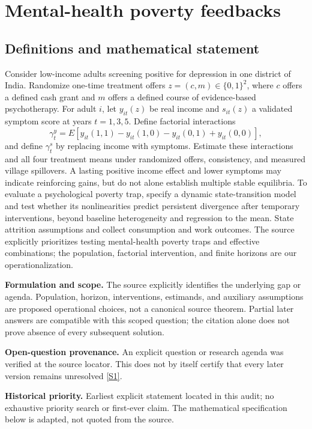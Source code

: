 \documentclass[11pt]{article}
\newcommand{\sref}[2]{\hyperlink{source:#1:#2}{[S#2]}}
\begin{document}
\section*{Mental-health poverty feedbacks}\label{30007730}
\subsection{Definitions and mathematical statement}
Consider low-income adults screening positive for depression in one district of India. Randomize one-time treatment offers \(z=(c,m)\in\{0,1\}^2\), where \(c\) offers a defined cash grant and \(m\) offers a defined course of evidence-based psychotherapy. For adult \(i\), let \(y_{it}(z)\) be real income and \(s_{it}(z)\) a validated symptom score at years \(t=1,3,5\). Define factorial interactions
\[\gamma_t^y=E[y_{it}(1,1)-y_{it}(1,0)-y_{it}(0,1)+y_{it}(0,0)],\]
and define \(\gamma_t^s\) by replacing income with symptoms. Estimate these interactions and all four treatment means under randomized offers, consistency, and measured village spillovers. A lasting positive income effect and lower symptoms may indicate reinforcing gains, but do not alone establish multiple stable equilibria. To evaluate a psychological poverty trap, specify a dynamic state-transition model and test whether its nonlinearities predict persistent divergence after temporary interventions, beyond baseline heterogeneity and regression to the mean. State attrition assumptions and collect consumption and work outcomes. The source explicitly prioritizes testing mental-health poverty traps and effective combinations; the population, factorial intervention, and finite horizons are our operationalization.

\par\textbf{Formulation and scope.} The source explicitly identifies the underlying gap or agenda. Population, horizon, interventions, estimands, and auxiliary assumptions are proposed operational choices, not a canonical source theorem. Partial later answers are compatible with this scoped question; the citation alone does not prove absence of every subsequent solution.

\par\textbf{Open-question provenance.} An explicit question or research agenda was verified at the source locator. This does not by itself certify that every later version remains unresolved \sref{30007730}{1}.

\par\textbf{Historical priority.} Earliest explicit statement located in this audit; no exhaustive priority search or first-ever claim. The mathematical specification below is adapted, not quoted from the source.
\end{document}
